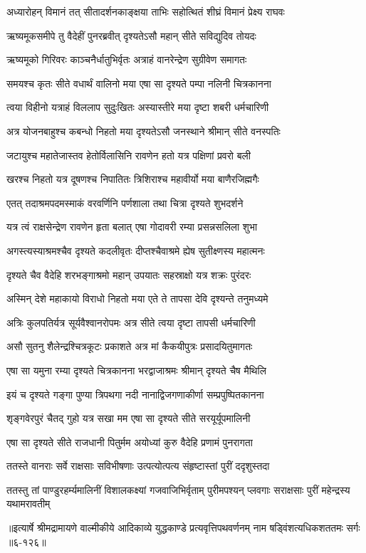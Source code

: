 \twolineshloka
{अध्यारोहन् विमानं तत् सीतादर्शनकाङ्क्षया}
{ताभिः सहोत्थितं शीघ्रं विमानं प्रेक्ष्य राघवः} %

\twolineshloka
{ऋष्यमूकसमीपे तु वैदेहीं पुनरब्रवीत्}
{दृश्यतेऽसौ महान् सीते सविद्युदिव तोयदः} %

\twolineshloka
{ऋष्यमूको गिरिवरः काञ्चनैर्धातुभिर्वृतः}
{अत्राहं वानरेन्द्रेण सुग्रीवेण समागतः} %

\twolineshloka
{समयश्च कृतः सीते वधार्थं वालिनो मया}
{एषा सा दृश्यते पम्पा नलिनी चित्रकानना} %

\twolineshloka
{त्वया विहीनो यत्राहं विललाप सुदुःखितः}
{अस्यास्तीरे मया दृष्टा शबरी धर्मचारिणी} %

\twolineshloka
{अत्र योजनबाहुश्च कबन्धो निहतो मया}
{दृश्यतेऽसौ जनस्थाने श्रीमान् सीते वनस्पतिः} %

\twolineshloka
{जटायुश्च महातेजास्तव हेतोर्विलासिनि}
{रावणेन हतो यत्र पक्षिणां प्रवरो बली} %

\twolineshloka
{खरश्च निहतो यत्र दूषणश्च निपातितः}
{त्रिशिराश्च महावीर्यो मया बाणैरजिह्मगैः} %

\twolineshloka
{एतत् तदाश्रमपदमस्माकं वरवर्णिनि}
{पर्णशाला तथा चित्रा दृश्यते शुभदर्शने} %

\twolineshloka
{यत्र त्वं राक्षसेन्द्रेण रावणेन हृता बलात्}
{एषा गोदावरी रम्या प्रसन्नसलिला शुभा} %

\twolineshloka
{अगस्त्यस्याश्रमश्चैव दृश्यते कदलीवृतः}
{दीप्तश्चैवाश्रमे ह्येष सुतीक्ष्णस्य महात्मनः} %

\twolineshloka
{दृश्यते चैव वैदेहि शरभङ्गाश्रमो महान्}
{उपयातः सहस्राक्षो यत्र शक्रः पुरंदरः} %

\twolineshloka
{अस्मिन् देशे महाकायो विराधो निहतो मया}
{एते ते तापसा देवि दृश्यन्ते तनुमध्यमे} %

\twolineshloka
{अत्रिः कुलपतिर्यत्र सूर्यवैश्वानरोपमः}
{अत्र सीते त्वया दृष्टा तापसी धर्मचारिणी} %

\twolineshloka
{असौ सुतनु शैलेन्द्रश्चित्रकूटः प्रकाशते}
{अत्र मां कैकयीपुत्रः प्रसादयितुमागतः} %

\twolineshloka
{एषा सा यमुना रम्या दृश्यते चित्रकानना}
{भरद्वाजाश्रमः श्रीमान् दृश्यते चैष मैथिलि} %

\twolineshloka
{इयं च दृश्यते गङ्गा पुण्या त्रिपथगा नदी}
{नानाद्विजगणाकीर्णा सम्प्रपुष्पितकानना} %

\twolineshloka
{शृङ्गवेरपुरं चैतद् गुहो यत्र सखा मम}
{एषा सा दृश्यते सीते सरयूर्यूपमालिनी} %

\twolineshloka
{एषा सा दृश्यते सीते राजधानी पितुर्मम}
{अयोध्यां कुरु वैदेहि प्रणामं पुनरागता} %

\twolineshloka
{ततस्ते वानराः सर्वे राक्षसाः सविभीषणाः}
{उत्पत्योत्पत्य संहृष्टास्तां पुरीं ददृशुस्तदा} %

\twolineshloka
{ततस्तु तां पाण्डुरहर्म्यमालिनीं विशालकक्ष्यां गजवाजिभिर्वृताम्}
{पुरीमपश्यन् प्लवगाः सराक्षसाः पुरीं महेन्द्रस्य यथामरावतीम्} %


॥इत्यार्षे श्रीमद्रामायणे वाल्मीकीये आदिकाव्ये युद्धकाण्डे प्रत्यवृत्तिपथवर्णनम् नाम षड्विंशत्यधिकशततमः सर्गः ॥६-१२६॥
